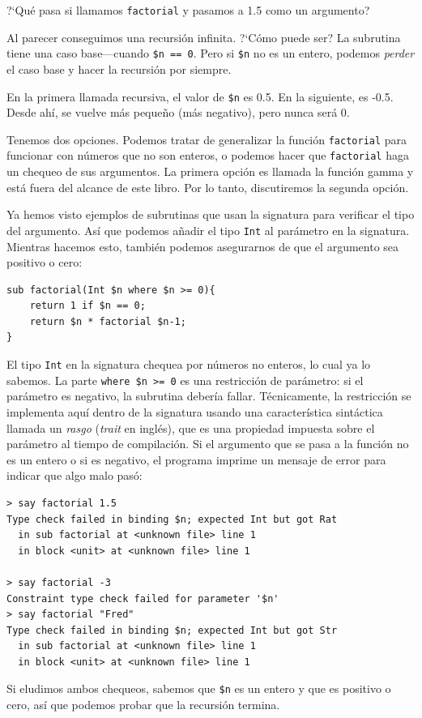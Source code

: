 ?`Qué pasa si llamamos {\tt factorial} y pasamos a 1.5 como un argumento?

Al parecer conseguimos una recursión infinita. ?`Cómo puede ser?
La subrutina tiene una caso base---cuando {\tt \$n == 0}. Pero 
si {\tt \$n} no es un entero, podemos {\em perder} el caso base 
y hacer la recursión por siempre. 

En la primera llamada recursiva, el valor de {\tt \$n} es 0.5.
En la siguiente, es -0.5. Desde ahí, se vuelve más pequeño 
(más negativo), pero nunca será 0.

Tenemos dos opciones. Podemos tratar de generalizar la función
{\tt factorial} para funcionar con números que no son enteros, o
podemos hacer que {\tt factorial} haga un chequeo de sus argumentos.
La primera opción es llamada la función gamma y está fuera del alcance 
de este libro. Por lo tanto, discutiremos la segunda opción.

Ya hemos visto ejemplos de subrutinas que usan la signatura para 
verificar el tipo del argumento. Así que podemos añadir el tipo
{\tt Int} al parámetro en la signatura. Mientras hacemos esto,
también podemos asegurarnos de que el argumento sea positivo o cero:

\begin{lstlisting}
sub factorial(Int $n where $n >= 0){
    return 1 if $n == 0;
    return $n * factorial $n-1;
}
\end{lstlisting}
%
El tipo {\tt Int} en la signatura chequea por números no enteros,
lo cual ya lo sabemos. La parte {\tt where \$n >= 0} es una restricción
de parámetro: si el parámetro es negativo, la subrutina debería
fallar. Técnicamente, la restricción se implementa aquí dentro de la
signatura usando una característica sintáctica llamada un \emph{rasgo}
(\emph{trait} en inglés), que es una propiedad impuesta sobre el parámetro
al tiempo de compilación. Si el argumento que se pasa a la función no
es un entero o si es negativo, el programa imprime un 
mensaje de error para indicar que algo malo pasó:

\begin{lstlisting}
> say factorial 1.5
Type check failed in binding $n; expected Int but got Rat
  in sub factorial at <unknown file> line 1
  in block <unit> at <unknown file> line 1

> say factorial -3
Constraint type check failed for parameter '$n'
> say factorial "Fred"
Type check failed in binding $n; expected Int but got Str
  in sub factorial at <unknown file> line 1
  in block <unit> at <unknown file> line 1
\end{lstlisting}
% 
Si eludimos ambos chequeos, sabemos que \verb|$n|
es un entero y que es positivo o cero, así que podemos 
probar que la recursión termina.


